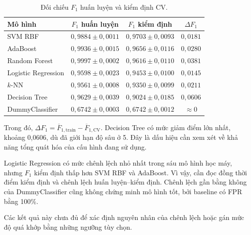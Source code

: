 \documentclass[12pt,a4paper,oneside]{report}
\begin{document}
\begin{table}[htbp]
    \centering
    \small
    \caption{Đối chiếu $F_1$ huấn luyện và kiểm định CV.}
    \label{tab:train_cv_f1}
    \begin{tabular}{lccc}
        \toprule
        \textbf{Mô hình}
        & \textbf{$F_1$ huấn luyện}
        & \textbf{$F_1$ kiểm định}
        & \textbf{$\Delta F_1$} \\
        \midrule
        SVM RBF
        & $0{,}9884 \pm 0{,}0011$
        & $0{,}9703 \pm 0{,}0093$
        & $0{,}0181$ \\

        AdaBoost
        & $0{,}9936 \pm 0{,}0015$
        & $0{,}9656 \pm 0{,}0116$
        & $0{,}0280$ \\

        Random Forest
        & $0{,}9997 \pm 0{,}0002$
        & $0{,}9616 \pm 0{,}0110$
        & $0{,}0381$ \\

        Logistic Regression
        & $0{,}9598 \pm 0{,}0023$
        & $0{,}9453 \pm 0{,}0100$
        & $0{,}0145$ \\

        $k$-NN
        & $0{,}9561 \pm 0{,}0008$
        & $0{,}9350 \pm 0{,}0099$
        & $0{,}0211$ \\

        Decision Tree
        & $0{,}9629 \pm 0{,}0039$
        & $0{,}9024 \pm 0{,}0185$
        & $0{,}0606$ \\

        DummyClassifier
        & $0{,}6742 \pm 0{,}0003$
        & $0{,}6742 \pm 0{,}0012$
        & $\approx 0$ \\
        \bottomrule
    \end{tabular}
\end{table}

Trong đó,
$\Delta F_1=\overline{F}_{1,\mathrm{train}}
-\overline{F}_{1,\mathrm{CV}}$.
Decision Tree có mức giảm điểm lớn nhất, khoảng 0,0606,
dù đã giới hạn độ sâu ở 5.
Đây là dấu hiệu cần xem xét về khả năng tổng quát hóa
của cấu hình đang sử dụng.

Logistic Regression có mức chênh lệch nhỏ nhất trong
sáu mô hình học máy, nhưng $F_1$ kiểm định thấp hơn
SVM RBF và AdaBoost. Vì vậy, cần đọc đồng thời điểm
kiểm định và chênh lệch huấn luyện--kiểm định.
Chênh lệch gần bằng không của DummyClassifier cũng
không chứng minh mô hình tốt, bởi baseline có
FPR bằng 100\%.

Các kết quả này chưa đủ để xác định nguyên nhân
của chênh lệch hoặc gán mức độ quá khớp bằng
những ngưỡng tùy chọn.
\end{document}
